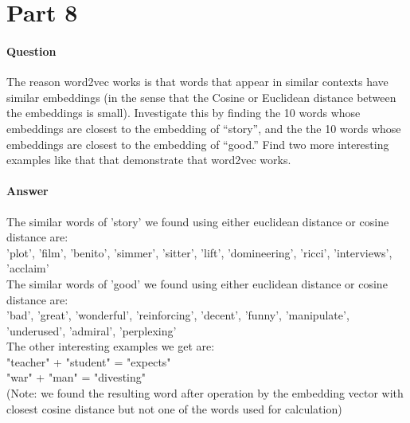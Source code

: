 \documentclass[11pt,twoside]{article}
\begin{document}
\clearpage

\section*{Part 8}
\paragraph{Question}
The reason word2vec works is that words that appear in similar contexts have similar embeddings (in the sense that the Cosine or Euclidean distance between the embeddings is small). Investigate this by finding the 10 words whose embeddings are closest to the embedding of “story”, and the the 10 words whose embeddings are closest to the embedding of “good.” Find two more interesting examples like that that demonstrate that word2vec works.

\paragraph{Answer}
The similar words of 'story' we found using either euclidean distance or cosine distance are:\\
'plot', 'film', 'benito', 'simmer', 'sitter', 'lift', 'domineering', 'ricci', 'interviews', 'acclaim'\\
The similar words of 'good' we found using either euclidean distance or cosine distance are:\\
'bad', 'great', 'wonderful', 'reinforcing', 'decent', 'funny', 'manipulate', 'underused', 'admiral', 'perplexing'\\
The other interesting examples we get are:\\
"teacher" + "student" = "expects"\\
"war" + "man" = "divesting"\\
(Note: we found the resulting word after operation by the embedding vector with closest cosine distance but not one of the words used for calculation)
\clearpage
\end{document}
